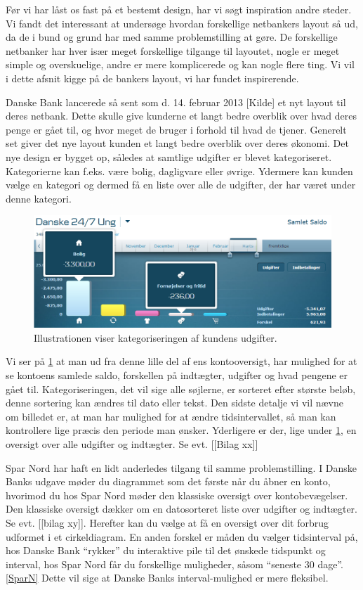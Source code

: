 Før vi har låst os fast på et bestemt design, har vi søgt inspiration andre steder. Vi fandt det interessant at undersøge hvordan forskellige netbankers layout så ud, da de i bund og grund har med samme problemstilling at gøre. De forskellige netbanker har hver især meget forskellige tilgange til layoutet, nogle er meget simple og overskuelige, andre er mere komplicerede og kan nogle flere ting. Vi vil i dette afsnit kigge på de bankers layout, vi har fundet inspirerende.

Danske Bank lancerede så sent som d. 14. februar 2013 [Kilde] et nyt layout til deres netbank. Dette skulle give kunderne et langt bedre overblik over hvad deres penge er gået til, og hvor meget de bruger i forhold til hvad de tjener. Generelt set giver det nye layout kunden et langt bedre overblik over deres økonomi. Det nye design er bygget op, således at samtlige udgifter er blevet kategoriseret. Kategorierne kan f.eks. være bolig, dagligvare eller øvrige. Ydermere kan kunden vælge en kategori og dermed få en liste over alle de udgifter, der har været under denne kategori. 

\begin{figure}[h!]
\centering
\includegraphics[width=1.0\textwidth]{Billeder/DanskeB.png}
\caption{ Illustrationen viser kategoriseringen af kundens udgifter.}
\label{DanskeB}
\end{figure}

Vi ser på \ref{DanskeB} at man ud fra denne lille del af ens kontooversigt, har mulighed for at se kontoens samlede saldo, forskellen på indtægter, udgifter og hvad pengene er gået til. Kategoriseringen, det vil sige alle søjlerne, er sorteret efter største beløb, denne sortering kan ændres til dato eller tekst. Den sidste detalje vi vil nævne om billedet er, at man har mulighed for at ændre tidsintervallet, så man kan kontrollere lige præcis den periode man ønsker. Yderligere er der, lige under \ref{DanskeB}, en oversigt over alle udgifter og indtægter. Se evt. [[Bilag xx]]

Spar Nord har haft en lidt anderledes tilgang til samme problemstilling. I Danske Banks udgave møder du diagrammet som det første når du åbner en konto, hvorimod du hos Spar Nord møder den klassiske oversigt over kontobevægelser. Den klassiske oversigt dækker om en datosorteret liste over udgifter og indtægter. Se evt. [[bilag xy]]. Herefter kan du vælge at få en oversigt over dit forbrug udformet i et cirkeldiagram. En anden forskel er måden du vælger tidsinterval på, hos Danske Bank “rykker” du interaktive pile til det ønskede tidspunkt og interval, hos Spar Nord får du forskellige muligheder, såsom “seneste 30 dage”. \ref{SparN} Dette vil sige at Danske Banks interval-mulighed er mere fleksibel.

